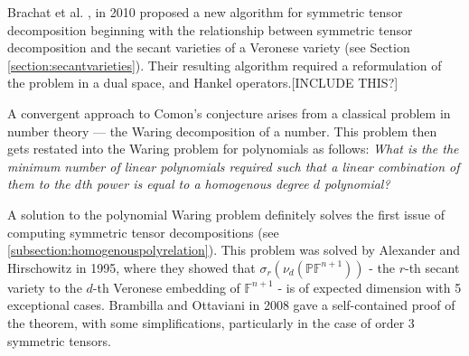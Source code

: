 \documentclass[12pt,a4paper,oneside]{book}
\def\complex{\mathbb{C}} %
\def\proj{\mathbb{P}} %
\def\field{\mathbb{F}} %
\theoremstyle{definition}
\begin{document}
Brachat et al. \cite{brachat_symmetric_2010}, in 2010 proposed a new algorithm for symmetric tensor decomposition beginning with the relationship between symmetric tensor decomposition and the secant varieties of a Veronese variety (see Section \cref{section:secantvarieties}). Their resulting algorithm required a reformulation of the problem in a dual space, and Hankel operators.[INCLUDE THIS?]

A convergent approach to Comon's conjecture arises from a classical problem in number theory --- the Waring decomposition of a number. This problem then gets restated into the Waring problem for polynomials as follows: \textit{What is the the minimum number of linear polynomials required such that a linear combination of them to the $d$th power is equal to a homogenous degree $d$ polynomial?} 

A solution to the polynomial Waring problem definitely solves the first issue of computing symmetric tensor decompositions (see \cref{subsection:homogenouspolyrelation}). This problem was solved by Alexander and Hirschowitz in 1995, where they showed that $\sigma_r(\nu_d(\proj \field^{n+1}))$ - the $r$-th secant variety to the $d$-th Veronese embedding of $\field^{n+1}$ - is of expected dimension with 5 exceptional cases. Brambilla and Ottaviani \cite{brambilla_alexanderhirschowitz_2008} in 2008 gave a self-contained proof of the theorem, with some simplifications, particularly in the case of order $3$ symmetric tensors.
\end{document}
